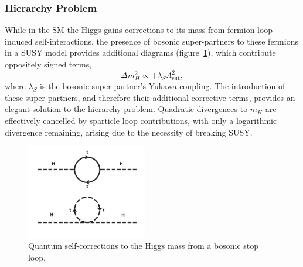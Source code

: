 \subsubsection{Hierarchy Problem}
While in the SM the Higgs gains corrections to its mass from fermion-loop
induced self-interactions, the presence of bosonic super-partners to these
fermions in a SUSY model provides additional diagrams (figure~\ref{fig:quantum_higgs_sboson_loop}),
which contribute oppositely signed terms,
% 
\begin{equation}
\Delta m_H^2 \propto + \lambda_S \Lambda_{\text{cut}}^2 ,
\end{equation}
% 
where $\lambda_S$ is the bosonic super-partner's Yukawa coupling. The introduction
of these super-partners, and therefore their additional corrective terms,
provides an elegant solution to the hierarchy problem. Quadratic
divergences to $m_H$ are effectively cancelled by sparticle loop contributions, with
only a logarithmic divergence remaining, arising due to the necessity of breaking
SUSY.

\begin{figure}[ht!]
\centering
\includegraphics[width=0.47\textwidth,trim=0 0 0 250, clip=true]
{Figs/feynman/600px-Hqmc-vector.png}
\caption{Quantum self-corrections to the Higgs mass from a bosonic stop
loop.}
\label{fig:quantum_higgs_sboson_loop}
\end{figure}

